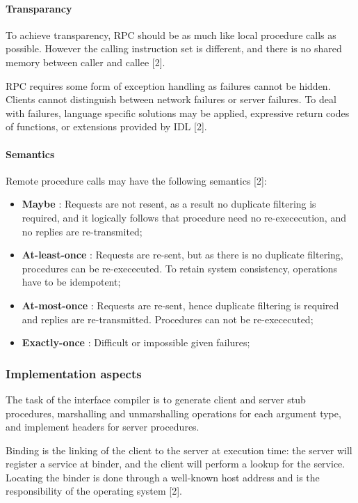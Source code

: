 \paragraph{Transparancy}

To achieve transparency, RPC should be as much like local procedure calls as possible. However the calling instruction set is different, and there is no shared memory between caller and callee [2].

RPC requires some form of exception handling as failures cannot be hidden. Clients cannot distinguish between network failures or server failures. To deal with failures, language specific solutions may be applied, expressive return codes of functions, or extensions provided by IDL [2].

\paragraph{Semantics}


Remote procedure calls may have the following semantics [2]:
\begin{itemize}
	\item \textbf{Maybe} : Requests are not resent, as a result no duplicate filtering is required, and it logically follows that procedure need no re-exececution, and no replies are re-transmited;
	\item \textbf{At-least-once} : Requests are re-sent, but as there is no duplicate filtering, procedures can be re-exececuted. To retain system consistency, operations have to be idempotent;
	\item \textbf{At-most-once} : Requests are re-sent, hence duplicate filtering is required and replies are re-transmitted. Procedures can not be re-exececuted;
	\item \textbf{Exactly-once} : Difficult or impossible given failures;
\end{itemize}



\subsubsection{Implementation aspects}

The task of the interface compiler is to generate client and server stub procedures, marshalling and unmarshalling operations for each argument type, and implement headers for server procedures.

Binding is the linking of the client to the server at execution time: the server will register a service at binder, and the client will perform a lookup for the service. Locating the binder is done through a well-known host address and is the responsibility of the operating system [2].


